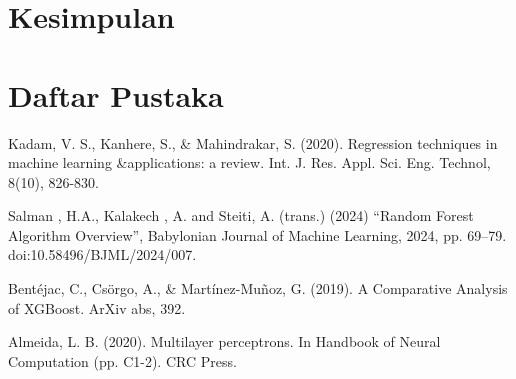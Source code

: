 \chapter*{Kesimpulan}


\chapter*{Daftar Pustaka}
Kadam, V. S., Kanhere, S., \& Mahindrakar, S. (2020). Regression techniques in machine learning \&applications: a review. Int. J. Res. Appl. Sci. Eng. Technol, 8(10), 826-830.

Salman , H.A., Kalakech , A. and Steiti, A. (trans.) (2024) “Random Forest Algorithm Overview”, Babylonian Journal of Machine Learning, 2024, pp. 69–79. doi:10.58496/BJML/2024/007.

Bentéjac, C., Csörgo, A., \& Martínez-Muñoz, G. (2019). A Comparative Analysis of XGBoost. ArXiv abs, 392.

Almeida, L. B. (2020). Multilayer perceptrons. In Handbook of Neural Computation (pp. C1-2). CRC Press.